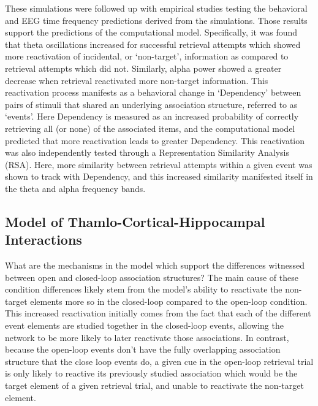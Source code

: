 \documentclass[11pt, titlepage, twoside]{article}
\begin{document}
These simulations were followed up with empirical studies testing the behavioral and EEG time frequency predictions derived from the simulations.  %
Those results support the predictions of the computational model.  Specifically, it was found that theta oscillations increased for successful retrieval attempts which showed more reactivation of incidental, or `non-target', information as compared to retrieval attempts which did not.  Similarly, alpha power showed a greater decrease when retrieval reactivated more non-target information.  This reactivation process manifests as a behavioral change in `Dependency' between pairs of stimuli that shared an underlying association structure, referred to as `events'.  Here Dependency is measured as an increased probability of correctly retrieving all (or none) of the associated items, and the computational model predicted that more reactivation leads to greater Dependency.  This reactivation was also independently tested through a Representation Similarity Analysis (RSA).  Here, more similarity between retrieval attempts within a given event was shown to track with Dependency, and this increased similarity manifested itself in the theta and alpha frequency bands.




\subsection{Model of Thamlo-Cortical-Hippocampal Interactions}

What are the mechanisms in the model which support the differences witnessed between open and closed-loop association structures? The main cause of these condition differences likely stem from the model's ability to reactivate the non-target elements more so in the closed-loop compared to the open-loop condition.  This increased reactivation initially comes from the fact that each of the different event elements are studied together in the closed-loop events, allowing the network to be more likely to later reactivate those associations.  In contrast, because the open-loop events don't have the fully overlapping association structure that the close loop events do, a given cue in the open-loop retrieval trial is only likely to reactive its previously studied association which would be the target element of a given retrieval trial, and unable to reactivate the non-target element.  
\end{document}
